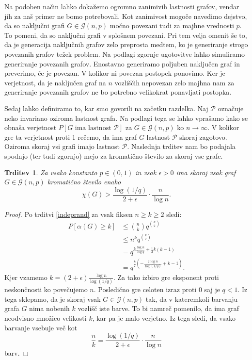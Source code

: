 \documentclass[12pt,a4paper,twoside]{article}
\theoremstyle{definition} %
\theoremstyle{plain} %
\newtheorem{trditev}[definicija]{Trditev}
\numberwithin{equation}{section}  %
\begin{document}
Na podoben način lahko dokažemo ogromno zanimivih lastnosti grafov, vendar jih za naš primer ne bomo potrebovali. Kot zanimivost mogoče navedimo dejstvo, da so naključni grafi $G \in \mathcal{G}(n, p)$ močno povezani tudi za majhne vrednosti $p$. To pomeni, da so naključni grafi v splošnem povezani. Pri tem velja omenit še to, da je generacija naključnih grafov zelo preprosta medtem, ko je generiranje strogo povezanih grafov težek problem. Na podlagi zgornje ugotovitve lahko simuliramo generiranje povezanih grafov. Enostavno generiramo poljuben naključen graf in preverimo, če je povezan. V kolikor ni povezan postopek ponovimo. Ker je verjetnost, da je naključen graf na $n$ vozliščih nepovezan zelo majhna nam za generiranje povezanih grafov ne bo potrebno velikokrat ponavljati postopka.

Sedaj lahko definiramo to, kar smo govorili na začetku razdelka. Naj $\mathcal{P}$ označuje neko invariano oziroma lastnost grafa. Na podlagi tega se lahko vprašamo kako se obnaša verjetnost $P[G \text{ ima lastnost } \mathcal{P}]$ za $G \in \mathcal{G}(n, p)$ ko $n \rightarrow \infty$. V kolikor gre ta verjetnost proti $1$ rečemo, da ima graf $G$ lastnost $\mathcal{P}$ skoraj zagotovo. Oziroma skoraj vsi grafi imajo lastnost $\mathcal{P}$. Naslednja trditev nam bo podajala spodnjo (ter tudi zgornjo) mejo za kromatično število za skoraj vse grafe.
\begin{trditev}
Za vsako konstanto $p \in (0,1)$ in vsak $\epsilon > 0$ ima skoraj vsak graf $G \in \mathcal{G}(n, p)$ kromatično število enako
$$ \chi(G) > \frac{\log(1/q)}{2 + \epsilon} \cdot \frac{n}{\log n}. $$
\end{trditev}
\begin{proof}
Po trditvi \ref{indeprand} za vsak fiksen $n \ge k \ge 2$ sledi:
\begin{equation}
\begin{split}
P[\alpha(G) \ge k]  &\le {n \choose k} q ^{k \choose 2} \\
& \le n^k q ^{k \choose 2} \\
&= q^{k \frac{\log n}{\log q} + \frac{1}{2}k(k-1)} \\
&= q^{\frac{k}{2}\left(- \frac{2 \log n}{\log(1/q)} + k - 1\right)}.
\end{split}
\end{equation}
Kjer vzamemo $k = (2 + \epsilon) \frac{\log n}{\log (1/q)}$. Za tako izbiro gre eksponent proti neskončnosti ko povečujemo $n$. Posledično gre celoten izraz proti $0$ saj je $q < 1$. Iz tega sklepamo, da je skoraj vsak $G \in \mathcal{G}(n, p)$ tak, da v kateremkoli barvanju grafa $G$ nima nobenih $k$ vozlišč iste barve. To bi namreč pomenilo, da ima graf neodvisno množico velikosti $k$, kar pa je malo verjetno. Iz tega sledi, da vsako barvanje vsebuje več kot 
$$ \frac{n}{k} = \frac{\log (1/q)}{2 + \epsilon} \cdot \frac{n}{\log n} $$
barv.
\end{proof}
\end{document}
